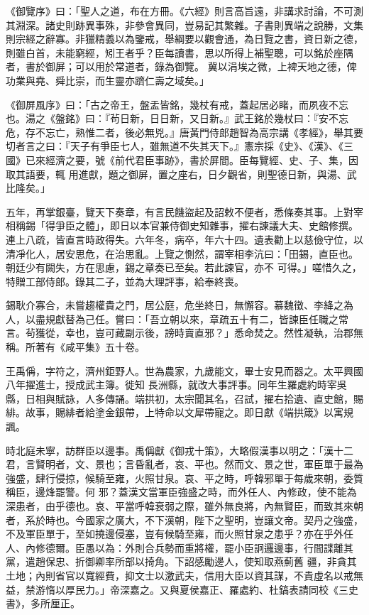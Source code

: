 \begin{pinyinscope}
 《御覽序》曰：「聖人之道，布在方冊。《六經》則言高旨遠，非講求討論，不可測其淵深。諸史則跡異事殊，非參會異同，豈易記其繁雜。子書則異端之說勝，文集則宗經之辭寡。非獵精義以為鑒戒，舉綱要以觀會通，為日覽之書，資日新之德，則雖白首，未能窮經，矧王者乎？臣每讀書，思以所得上補聖聰，可以銘於座隅者，書於御屏；可以用於常道者，錄為御覽。
 冀以涓埃之微，上裨天地之德，俾功業與堯、舜比崇，而生靈亦躋仁壽之域矣。」



 《御屏風序》曰：「古之帝王，盤盂皆銘，幾杖有戒，蓋起居必睹，而夙夜不忘也。湯之《盤銘》曰：『茍日新，日日新，又日新。』武王銘於幾杖曰：『安不忘危，存不忘亡，熟惟二者，後必無兇。』唐黃門侍郎趙智為高宗講《孝經》，舉其要切者言之曰：『天子有爭臣七人，雖無道不失其天下。』憲宗採《史》、《漢》、《三國》已來經濟之要，號《前代君臣事跡》，書於屏間。臣每覽經、史、子、集，因取其語要，輒
 用進獻，題之御屏，置之座右，日夕觀省，則聖德日新，與湯、武比隆矣。」



 五年，再掌銀臺，覽天下奏章，有言民饑盜起及詔敕不便者，悉條奏其事。上對宰相稱錫「得爭臣之體」，即日以本官兼侍御史知雜事，擢右諫議大夫、史館修撰。連上八疏，皆直言時政得失。六年冬，病卒，年六十四。遺表勸上以慈儉守位，以清凈化人，居安思危，在治思亂。上覽之惻然，謂宰相李沆曰：「田錫，直臣也。朝廷少有闕失，方在思慮，錫之章奏已至矣。若此諫官，亦不
 可得。」嗟惜久之，特贈工部侍郎。錄其二子，並為大理評事，給奉終喪。



 錫耿介寡合，未嘗趨權貴之門，居公庭，危坐終日，無懈容。慕魏徵、李絳之為人，以盡規獻替為己任。嘗曰：「吾立朝以來，章疏五十有二，皆諫臣任職之常言。茍獲從，幸也，豈可藏副示後，謗時賣直邪？」悉命焚之。然性凝執，治郡無稱。所著有《咸平集》五十卷。



 王禹偁，字符之，濟州鉅野人。世為農家，九歲能文，畢士安見而器之。太平興國八年擢進士，授成武主簿。徙知
 長洲縣，就改大事評事。同年生羅處約時宰吳縣，日相與賦詠，人多傳誦。端拱初，太宗聞其名，召試，擢右拾遺、直史館，賜緋。故事，賜緋者給塗金銀帶，上特命以文犀帶寵之。即日獻《端拱箴》以寓規諷。



 時北庭未寧，訪群臣以邊事。禹偁獻《御戎十策》，大略假漢事以明之：「漢十二君，言賢明者，文、景也；言昏亂者，哀、平也。然而文、景之世，軍臣單于最為強盛，肆行侵掠，候騎至雍，火照甘泉。哀、平之時，呼韓邪單于每歲來朝，委質稱臣，邊烽罷警。何
 邪？蓋漢文當軍臣強盛之時，而外任人、內修政，使不能為深患者，由乎德也。哀、平當呼韓衰弱之際，雖外無良將，內無賢臣，而致其來朝者，系於時也。今國家之廣大，不下漢朝，陛下之聖明，豈讓文帝。契丹之強盛，不及軍臣單于，至如撓邊侵塞，豈有候騎至雍，而火照甘泉之患乎？亦在乎外任人、內修德爾。臣愚以為：外則合兵勢而重將權，罷小臣詗邏邊事，行間諜離其黨，遣趙保忠、折御卿率所部以掎角。下詔感勵邊人，使知取燕薊舊
 疆，非貪其土地；內則省官以寬經費，抑文士以激武夫，信用大臣以資其謀，不貴虛名以戒無益，禁游惰以厚民力。」帝深嘉之。又與夏侯嘉正、羅處約、杜鎬表請同校《三史書》，多所厘正。




\end{pinyinscope}
